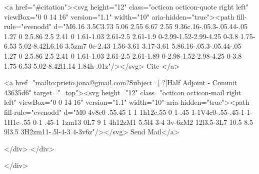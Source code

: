       <a  href="#citation"><svg height="12" class="octicon octicon-quote right left" viewBox="0 0 14 16" version="1.1" width="10" aria-hidden="true"><path fill-rule="evenodd" d="M6.16 3.5C3.73 5.06 2.55 6.67 2.55 9.36c.16-.05.3-.05.44-.05 1.27 0 2.5.86 2.5 2.41 0 1.61-1.03 2.61-2.5 2.61-1.9 0-2.99-1.52-2.99-4.25 0-3.8 1.75-6.53 5.02-8.42L6.16 3.5zm7 0c-2.43 1.56-3.61 3.17-3.61 5.86.16-.05.3-.05.44-.05 1.27 0 2.5.86 2.5 2.41 0 1.61-1.03 2.61-2.5 2.61-1.89 0-2.98-1.52-2.98-4.25 0-3.8 1.75-6.53 5.02-8.42l1.14 1.84h-.01z"/></svg> Cite
      </a>

      <a href="mailto:prieto.jona@gmail.com?Subject=[ ?]Half Adjoint - Commit 43635d6" target="_top"><svg height="12" class="octicon octicon-mail right left" viewBox="0 0 14 16" version="1.1" width="10" aria-hidden="true"><path fill-rule="evenodd" d="M0 4v8c0 .55.45 1 1 1h12c.55 0 1-.45 1-1V4c0-.55-.45-1-1-1H1c-.55 0-1 .45-1 1zm13 0L7 9 1 4h12zM1 5.5l4 3-4 3v-6zM2 12l3.5-3L7 10.5 8.5 9l3.5 3H2zm11-.5l-4-3 4-3v6z"/></svg> Send Mail</a>

    </div>
  </div>

</div>




